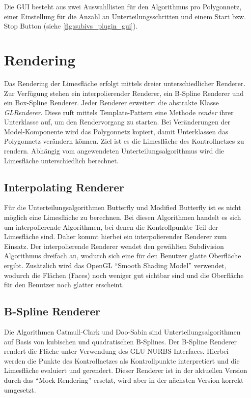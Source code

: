 Die GUI besteht aus zwei Auswahllisten für den Algorithmus pro Polygonnetz, einer Einstellung für die Anzahl an Unterteilungsschritten und einem Start bzw. Stop Button (siehe \autoref{fig:subivs_plugin_gui}).

\section{Rendering}
Das Rendering der Limesfläche erfolgt mittels dreier unterschiedlicher Renderer. Zur Verfügung stehen ein interpolierender Renderer, ein B-Spline Renderer und ein Box-Spline Renderer.
Jeder Renderer erweitert die abstrakte Klasse \emph{GLRenderer}. 
Diese ruft mittels Template-Pattern eine Methode \emph{render} ihrer Unterklasse auf, um den Rendervorgang zu starten.
Bei Veränderungen der Model-Komponente wird das Polygonnetz kopiert, damit Unterklassen das Polygonnetz verändern können.
Ziel ist es die Limesfläche des Kontrollnetzes zu rendern.
Abhängig vom angewendeten Unterteilungsalgorithmus wird die
Limesfläche unterschiedlich berechnet.

\subsection{Interpolating Renderer}
Für die Unterteilungsalgorithmen Butterfly und Modified Butterfly ist es nicht möglich eine Limesfläche zu berechnen.
Bei diesen Algorithmen handelt es sich um interpolierende Algorithmen, bei denen die Kontrollpunkte Teil der Limesfläche sind.
Daher kommt hierbei ein interpolierender Renderer zum Einsatz.
Der interpolierende Renderer wendet den gewählten Subdivision Algorithmus dreifach an, wodurch sich eine für den Benutzer glatte Oberfläche ergibt. 
Zusätzlich wird das OpenGL \enquote{Smooth Shading Model} verwendet, wodurch die Flächen (Faces) noch weniger gut sichtbar sind und die Oberfläche für den Benutzer noch glatter erscheint.

\subsection{B-Spline Renderer}
Die Algorithmen Catmull-Clark und Doo-Sabin sind Unterteilungsalgorithmen auf Basis von kubischen und quadratischen B-Splines.
Der B-Spline Renderer rendert die Fläche unter Verwendung des GLU NURBS Interfaces.
Hierbei werden die Punkte des Kontrollnetzes als Kontrollpunkte interpretiert und die Limesfläche evaluiert und gerendert.
Dieser Renderer ist in der aktuellen Version durch das \enquote{Mock Rendering} ersetzt, wird aber in der nächsten Version korrekt umgesetzt.

